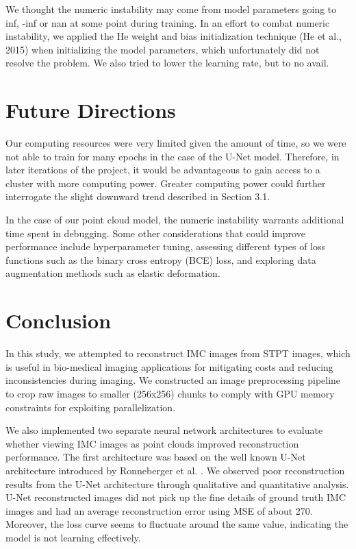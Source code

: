 \documentclass[10pt,twocolumn,letterpaper]{article}
\begin{document}
We thought the numeric instability may come from model parameters going to inf, -inf or nan at some point during training. In an effort to combat numeric instability, we applied the He weight and bias initialization technique (He et al., 2015) when initializing the model parameters, which unfortunately did not resolve the problem. We also tried to lower the learning rate, but to no avail.


\section{Future Directions}
Our computing resources were very limited given the amount of time, so we were not able to train for many epochs in the case of the U-Net model. Therefore, in later iterations of the project, it would be advantageous to gain access to a cluster with more computing power. Greater computing power could further interrogate the slight downward trend described in Section 3.1.

In the case of our point cloud model, the numeric instability warrants additional time spent in debugging. Some other considerations that could improve performance include hyperparameter tuning, assessing different types of loss functions such as the binary cross entropy (BCE) loss, and exploring data augmentation methods such as elastic deformation.

\section{Conclusion}
In this study, we attempted to reconstruct IMC images from STPT images, which is useful in bio-medical imaging applications for mitigating costs and reducing inconsistencies during imaging. We constructed an image preprocessing pipeline to crop raw images to smaller (256x256) chunks to comply with GPU memory constraints for exploiting parallelization. 

We also implemented two separate neural network architectures to evaluate whether viewing IMC images as point clouds improved reconstruction performance. The first architecture was based on the well known U-Net architecture introduced by Ronneberger et al. \cite{ronneberger_2015_unet}. We observed poor reconstruction results from the U-Net architecture through qualitative and quantitative analysis. U-Net reconstructed images did not pick up the fine details of ground truth IMC images and had an average reconstruction error using MSE of about 270. Moreover, the loss curve seems to fluctuate around the same value, indicating the model is not learning effectively. 
\end{document}
